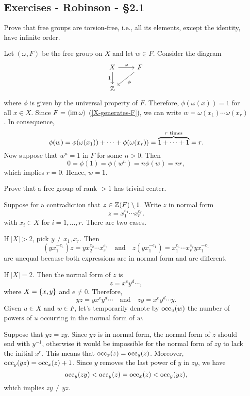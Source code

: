 \subsection{Exercises - Robinson - \S 2.1}

\begin{exr}
    Prove that free groups are torsion-free, i.e., all its elements, except the identity, have infinite order.
\end{exr}

\begin{solution}
    Let $(\omega, F)$ be the free group on $X$ and let $w\in F$. Consider the diagram
    $$
        \begin{tikzcd}
            X
                    \arrow[d,"1"']
                    \arrow[r,"\omega"]
                &F
                    \arrow[ld,"\phi"]\\
                \Z
        \end{tikzcd}
    $$
    where $\phi$ is given by the universal property of $F$. Therefore, $\phi(\omega(x))=1$ for all $x\in X$. Since $F=\langle\operatorname{im}\omega\rangle$ (\ref{X-generates-F}), we can write $w=\omega(x_1)\cdots\omega(x_r)$. In consequence,
    $$
        \phi(w)=\phi(\omega(x_1))+\cdots+\phi(\omega(x_r))
            = \overbrace{1+\cdots+1}^{r\ \rm times}
            = r.
    $$
    Now suppose that $w^n=1$ in $F$ for some $n>0$. Then
    $$
        0=\phi(1)=\phi(w^n)=n\phi(w)=nr,
    $$
    which implies $r=0$. Hence, $w=1$.
\end{solution}

\begin{exr}
    Prove that a free group of rank\/ $>1$ has trivial center.
\end{exr}

\begin{solution}
    Suppose for a contradiction that $z\in\mathbb{Z}(F)\setminus1$. Write $z$ in normal form
    $$
        z = x_1^{e_1}\cdots x_r^{e_r}.
    $$
    with $x_i\in X$ for $i=1,\dots,r$. There are two cases.

    If $|X|>2$, pick $y\ne x_1,x_r$. Then
    $$
        (yx_1^{-e_1})z = yx_2^{e_2}\cdots x_r^{e_r}
        \quad\text{and}\quad
        z(yx_1^{-e_1}) = x_1^{e_1}\cdots x_r^{e_r}yx_1^{-e_1}
    $$
    are unequal because both expressions are in normal form and are different.

    If $|X|=2$. Then the normal form of $z$ is
    $$
        z = x^ey^d\cdots,
    $$
    where $X=\{x,y\}$ and $e\ne0$. Therefore,
    $$
        yz = yx^ey^d\cdots
        \quad\text{and}\quad
        zy = x^ey^d\cdots y.
    $$
    Given $u\in X$ and $w\in F$, let's temporarily denote by $\operatorname{occ}_u(w)$ the number of powers of $u$ occurring in the normal form of $w$.
    
    Suppose that $yz=zy$. Since $yz$ is in normal form, the normal form of $z$ should end with $y^{-1}$, otherwise it would be impossible for the normal form of $zy$ to lack the initial $x^e$. This means that $\operatorname{occ}_x(z)=\operatorname{occ}_y(z)$. Moreover, $\operatorname{occ}_y(yz)=\operatorname{occ}_x(z)+1$. Since $y$ removes the last power of $y$ in $zy$, we have
    $$
        \operatorname{occ}_y(zy)<\operatorname{occ}_y(z)=\operatorname{occ}_x(z)<\operatorname{occ}_y(yz),
    $$
    which implies $zy\ne yz$.
\end{solution}

